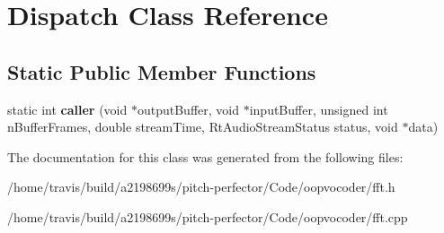 \hypertarget{classDispatch}{\section{Dispatch Class Reference}
\label{classDispatch}
}
\subsection*{Static Public Member Functions}
\begin{DoxyCompactItemize}
\item 
\hypertarget{classDispatch_a53ca7df90385512d941a0b4cca324661}{static int {\bfseries caller} (void $\ast$output\-Buffer, void $\ast$input\-Buffer, unsigned int n\-Buffer\-Frames, double stream\-Time, Rt\-Audio\-Stream\-Status status, void $\ast$data)}\label{classDispatch_a53ca7df90385512d941a0b4cca324661}

\end{DoxyCompactItemize}


The documentation for this class was generated from the following files\-:\begin{DoxyCompactItemize}
\item 
/home/travis/build/a2198699s/pitch-\/perfector/\-Code/oopvocoder/fft.\-h\item 
/home/travis/build/a2198699s/pitch-\/perfector/\-Code/oopvocoder/fft.\-cpp\end{DoxyCompactItemize}
